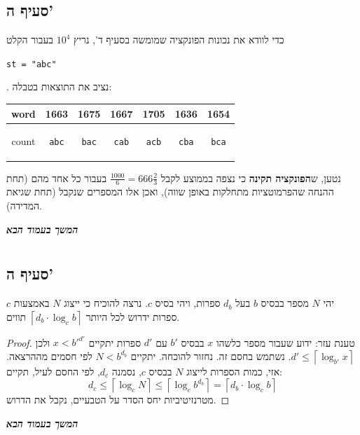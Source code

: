 \documentclass[]{article}
\newcommand\en[1] {\begin{otherlanguage}{english}#1\end{otherlanguage}}
\newcommand\sen   {\begin{otherlanguage}{english}}
\newcommand\she   {\end{otherlanguage}}
\newcommand\ttt[1]{\en{\footnotesize\texttt{#1}\normalsize}}
\newcommand\npage {\vfil {\hfil \textbf{\textit{המשך בעמוד הבא}}} \hfil \vfil \pagebreak}
\newcommand\rc    {\right\rceil}
\newcommand\lc    {\left\lceil}
\begin{document}
	\subsection*{סעיף ה'}
	כדי לוודא את נכונות הפונקציה שמומשה בסעיף ד', נריץ $10^{4}$ בעבור הקלט \ttt{st = "abc"}. נציב את התוצאות בטבלה: 
	
	\sen
	\begin{center}
		\begin{tabular}{|c|c|c|c|c|c|c|}
			\hline word & 1663 & 1675 & 1667 & 1705 & 1636 & 1654 \\
			\hline count & \ttt{abc} & \ttt{bac} & \ttt{cab} & \ttt{acb} & \ttt{cba} & \ttt{bca} \\
			\hline 
		\end{tabular}
	\end{center}
	\she
	נטען, ש\textbf{הפונקציה תקינה} כי נצפה בממוצע לקבל $\frac{1000}{6} = 666\frac{2}{3}$ בעבור כל אחד מהם (תחת ההנחה שהפרמוטציות מתחלקות באופן שווה), ואכן אלו המספרים שנקבל (תחת שגיאת המדידה). 
	
	\npage
	
	\section{} %
	\subsection*{סעיף ה'}
	יהי $N$ מספר בבסיס $b$ בעל $d_b$ ספרות, ויהי בסיס $c$. נרצה להוכיח כי ייצוג $N$ באמצעות $c$ ספרות ידרוש לכל היותר $\lc d_b \cdot \log_c b \rc$ תווים. 
	
	\begin{proof}
		טענת עזר: ידוע שעבור מספר כלשהו $x$ בבסיס $b'$ עם $d'$ ספרות יתקיים $x < b'^{d'}$ ולכן $d' \le \lc \log_{b'}x \rc $. נשתמש בחסם זה. נחזור להוכחה. יתקיים $N < b^{d_b}$ לפי חסמים מההרצאה. אזי, כמות הספרות לייצוג $N$ בבסיס $c$, נסמנה $d_c$, לפי החסם לעיל, תקיים: 
		\[ d_c \le \lc \log_{c}N \rc \le \lc \log_c b^{d_b} \rc = \lc d_b \cdot \log_c b \rc \]
		מטרנזיטיביות יחס הסדר על הטבעיים, נקבל את הדרוש. 
	\end{proof}
	
	\npage
\end{document}
